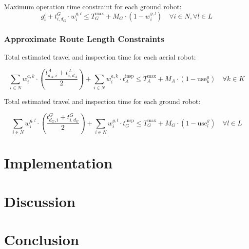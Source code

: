 \documentclass{article}
\begin{document}
				Maximum operation time constraint for each ground robot:
				\begin{equation}
				g_i^l + t_{i,d_G}^{G} \cdot w_i^{g,l} \leq T_G^{\max} + M_G \cdot (1 - w_i^{g,l}) \quad \forall i \in N, \forall l \in L
				\end{equation}

			\subsubsection{Approximate Route Length Constraints}

			Total estimated travel and inspection time for each aerial robot:

			\begin{equation}
			\sum_{i \in N} w_i^{a,k} \cdot \left( \frac{t_{d_A,i}^{A} + t_{i,d_A}^{A}}{2} \right) + \sum_{i \in N} w_i^{a,k} \cdot t_A^{\text{insp}} \leq T_A^{\max} + M_A \cdot (1 - \text{use}_k^a) \quad \forall k \in K
			\end{equation}

			Total estimated travel and inspection time for each ground robot:

			\begin{equation}
			\sum_{i \in N} w_i^{g,l} \cdot \left( \frac{t_{d_G,i}^{G} + t_{i,d_G}^{G}}{2} \right) + \sum_{i \in N} w_i^{g,l} \cdot t_G^{\text{insp}} \leq T_G^{\max} + M_G \cdot (1 - \text{use}_l^g) \quad \forall l \in L
			\end{equation}


	\section{Implementation}

	\section{Discussion}

	\section{Conclusion}

	\newpage
	
	\nocite{*}
	
\end{document}
